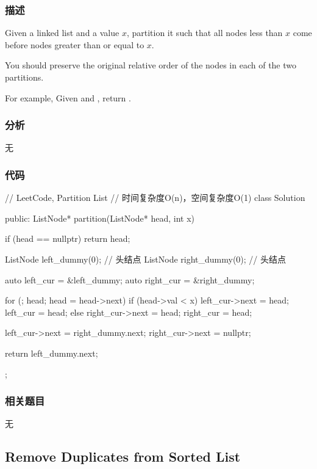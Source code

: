 \subsubsection{描述}
Given a linked list and a value $x$, partition it such that all nodes less than $x$ come before nodes greater than or equal to $x$.

You should preserve the original relative order of the nodes in each of the two partitions.

For example,
Given  and , return .


\subsubsection{分析}
无


\subsubsection{代码}
\begin{Code}
// LeetCode, Partition List
// 时间复杂度O(n)，空间复杂度O(1)
class Solution {
public:
    ListNode* partition(ListNode* head, int x) {
        if (head == nullptr) return head;

        ListNode left_dummy(0); // 头结点
        ListNode right_dummy(0); // 头结点

        auto left_cur = &left_dummy;
        auto right_cur = &right_dummy;

        for (; head; head = head->next) {
            if (head->val < x) {
                left_cur->next = head;
                left_cur = head;
            } else {
                right_cur->next = head;
                right_cur = head;
            }
        }

        left_cur->next = right_dummy.next;
        right_cur->next = nullptr;

        return left_dummy.next;
    }
};
\end{Code}


\subsubsection{相关题目}

\begindot
\item 无
\myenddot


\subsection{Remove Duplicates from Sorted List}
\label{sec:remove-duplicates-from-sorted-list}



